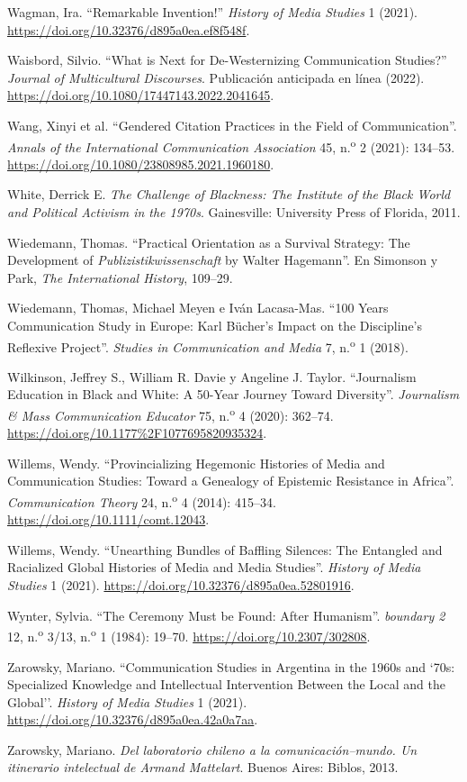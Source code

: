 \documentclass{tufte-handout}
\begin{document}
\begin{hangparas}{.25in}{1}
Wagman, Ira. ``Remarkable Invention!'' \emph{History of Media Studies} 1
(2021). \url{https://doi.org/10.32376/d895a0ea.ef8f548f}.

Waisbord, Silvio. ``What is Next for De-Westernizing Communication
Studies?'' \emph{Journal of Multicultural Discourses}. Publicación
anticipada en línea (2022).
\url{https://doi.org/10.1080/17447143.2022.2041645}.

Wang, Xinyi et al. ``Gendered Citation Practices in the Field of
Communication''. \emph{Annals of the International Communication
Association} 45, n.\textsuperscript{o} 2 (2021): 134--53.
\url{https://doi.org/10.1080/23808985.2021.1960180}.

White, Derrick E. \emph{The Challenge of Blackness: The Institute of the
Black World and Political Activism in the 1970s}. Gainesville:
University Press of Florida, 2011.

Wiedemann, Thomas. ``Practical Orientation as a Survival Strategy: The
Development of \emph{Publizistikwissenschaft} by Walter Hagemann''. En
Simonson y Park, \emph{The International History}, 109--29.

Wiedemann, Thomas, Michael Meyen e Iván Lacasa-Mas. ``100 Years
Communication Study in Europe: Karl Bücher's Impact on the Discipline's
Reflexive Project''. \emph{Studies in Communication and Media} 7,
n.\textsuperscript{o} 1 (2018).

Wilkinson, Jeffrey S., William R. Davie y Angeline J. Taylor.
``Journalism Education in Black and White: A 50-Year Journey Toward
Diversity''. \emph{Journalism \& Mass Communication Educator} 75,
n.\textsuperscript{o} 4 (2020): 362--74.
\url{https://doi.org/10.1177\%2F1077695820935324}.

Willems, Wendy. ``Provincializing Hegemonic Histories of Media and
Communication Studies: Toward a Genealogy of Epistemic Resistance in
Africa''. \emph{Communication Theory} 24, n.\textsuperscript{o} 4
(2014): 415--34. \url{https://doi.org/10.1111/comt.12043}.

Willems, Wendy. ``Unearthing Bundles of Baffling Silences: The Entangled
and Racialized Global Histories of Media and Media Studies''.
\emph{History of Media Studies} 1 (2021).
\url{https://doi.org/10.32376/d895a0ea.52801916}.

Wynter, Sylvia. ``The Ceremony Must be Found: After Humanism''.
\emph{boundary 2} 12, n.\textsuperscript{o} 3/13, n.\textsuperscript{o}
1 (1984): 19--70. \url{https://doi.org/10.2307/302808}.

Zarowsky, Mariano. ``Communication Studies in Argentina in the 1960s and
`70s: Specialized Knowledge and Intellectual Intervention Between the
Local and the Global''. \emph{History of Media Studies} 1 (2021).
\url{https://doi.org/10.32376/d895a0ea.42a0a7aa}.

Zarowsky, Mariano. \emph{Del laboratorio chileno a la
comunicación--mundo. Un itinerario intelectual} \emph{de Armand
Mattelart}. Buenos Aires: Biblos, 2013.



\end{hangparas}
\end{document}

